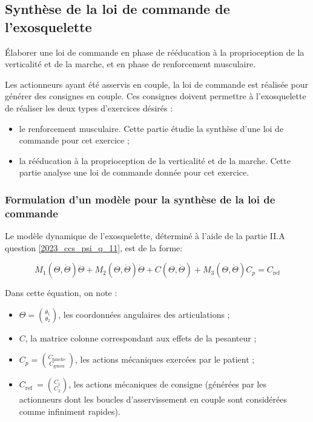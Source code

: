 \subsection{Synthèse de la loi de commande de l'exosquelette}
\begin{obj}
Élaborer une loi de commande en phase de rééducation à la proprioception de la verticalité et de la marche, et en phase de renforcement musculaire.
\end{obj}
Les actionneurs ayant été asservis en couple, la loi de commande est réalisée pour générer des consignes en couple. Ces consignes doivent permettre à l'exosquelette de réaliser les deux types d'exercices désirés :

\begin{itemize}
  \item le renforcement musculaire. Cette partie étudie la synthèse d'une loi de commande pour cet exercice ;
  \item la rééducation à la proprioception de la verticalité et de la marche. Cette partie analyse une loi de commande donnée pour cet exercice.
\end{itemize}

\subsubsection{Formulation d'un modèle pour la synthèse de la loi de commande}
Le modèle dynamique de l'exosquelette, déterminé à l'aide de la partie II.A question \ref{2023_ccs_psi_q_11}, est de la forme:

$$
M_{1}(\Theta, \dot{\Theta}) \ddot{\Theta}+M_{2}(\Theta, \dot{\Theta}) \dot{\Theta}+C(\Theta, \dot{\Theta})+M_{3}(\Theta, \dot{\Theta}) C_{p}=C_{\mathrm{ref}}
$$

Dans cette équation, on note :

\begin{itemize}
  \item $\Theta=\binom{\theta_{1}}{\theta_{2}}$, les coordonnées angulaires des articulations ;
  \item $C$, la matrice colonne correspondant aux effets de la pesanteur ;
  \item $C_{p}=\binom{C_{\text {hanche }}}{C_{\text {genou }}}$, les actions mécaniques exercées par le patient ;
  \item $C_{\text {ref }}=\binom{C_{1}}{C_{2}}$, les actions mécaniques de consigne (générées par les actionneurs dont les boucles d'asservissement en couple sont considérées comme infiniment rapides).\\
\end{itemize}

